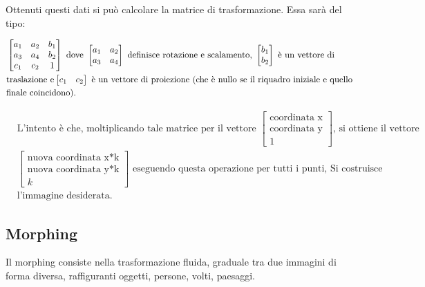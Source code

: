 \vspace{30em} \noindent
Ottenuti questi dati si può calcolare la matrice di trasformazione. Essa sarà del tipo:

\begin{align*}
&\begin{bmatrix}
a_1&a_2&b_1\\
a_3&a_4&b_2\\
c_1&c_2&1
\end{bmatrix}
\text{ dove }
\begin{bmatrix}
a_1&a_2\\
a_3&a_4
\end{bmatrix}
\text{ definisce rotazione e scalamento, } 
\begin{bmatrix}
b_1\\
b_2
\end{bmatrix}
\text{ è un vettore di}\\
&\text{traslazione e} 
\newline
\begin{bmatrix}
c_1&c_2
\end{bmatrix}
\text{ è un vettore di proiezione (che è nullo se il riquadro iniziale e quello}\\
&\text{finale coincidono).}\\
\end{align*}

\vspace{-3em}

\begin{align*}
&\text{L'intento è che, moltiplicando tale matrice per il vettore  }
\begin{bmatrix}
\text{coordinata x}\\
\text{coordinata y}\\
1
\end{bmatrix}
\text{, si ottiene il vettore}\\
&\begin{bmatrix}
\text{nuova coordinata x*k}\\
\text{nuova coordinata y*k}\\
k
\end{bmatrix}
\text{ eseguendo questa operazione per tutti i punti, Si costruisce }\\
&\text{l'immagine desiderata.}
\end{align*}

\subsection{Morphing}
Il morphing consiste nella trasformazione fluida, graduale tra due immagini di forma diversa, raffiguranti oggetti, persone, volti, paesaggi.

